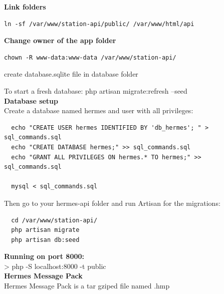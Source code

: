 \textbf{Link folders}
\begin{verbatim}
ln -sf /var/www/station-api/public/ /var/www/html/api
\end{verbatim}

\textbf{Change owner of the app folder}
\begin{verbatim}
chown -R www-data:www-data /var/www/station-api/ 
\end{verbatim}

create database.sqlite file in database folder

To start a fresh database: php artisan migrate:refresh --seed\\

\textbf{Database setup}\\

Create a database named hermes and user with all privileges:

\begin{verbatim}
  echo "CREATE USER hermes IDENTIFIED BY 'db_hermes'; " > sql_commands.sql
  echo "CREATE DATABASE hermes;" >> sql_commands.sql
  echo "GRANT ALL PRIVILEGES ON hermes.* TO hermes;" >> sql_commands.sql
  
  mysql < sql_commands.sql
\end{verbatim}

Then go to your hermes-api folder and run Artisan for the migrations:
\begin{verbatim}
  cd /var/www/station-api/
  php artisan migrate
  php artisan db:seed    
\end{verbatim}

\textbf{Running on port 8000:}\\

> php -S localhost:8000 -t public\\

\textbf{Hermes Message Pack}\\
Hermes Message Pack is a tar gziped file named .hmp\\






